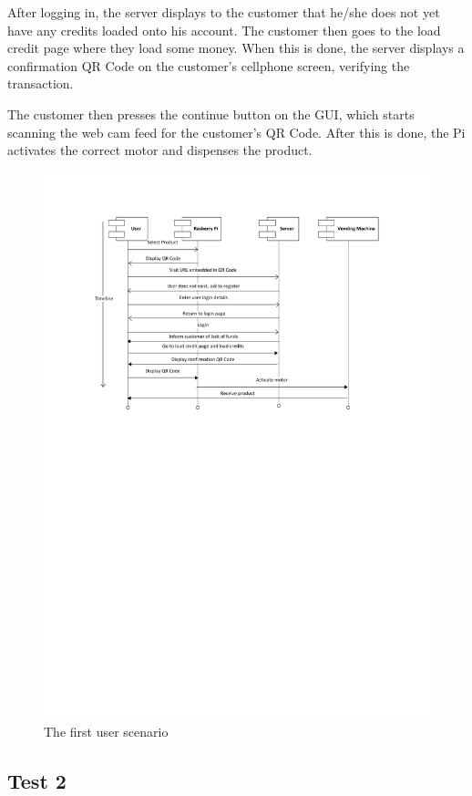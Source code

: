 After logging in, the server displays to the customer that he/she does not yet have any
credits loaded onto his account. The customer then goes to the load credit page where
they load some money. When this is done, the server displays a confirmation QR Code on
the customer's cellphone screen, verifying the transaction.

The customer then presses the continue button on the GUI, which starts scanning the web
cam feed for the customer's QR Code. After this is done, the Pi activates the correct
motor and dispenses the product.

\begin{figure}
 \centering 
 \includegraphics[clip=true, trim = 0 470 0 50,
 scale=0.7]{user_story_1}
 \caption{The first user scenario}
 \label{fig:test1}
\end{figure}

\subsection{Test 2}

